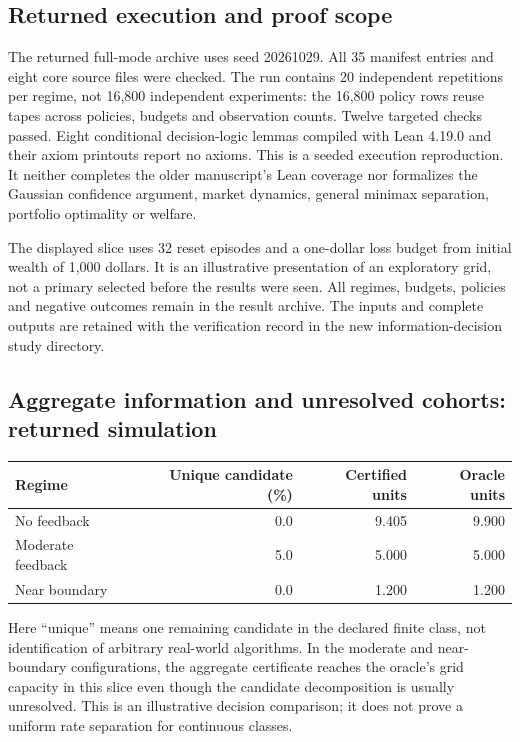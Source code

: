 \documentclass[12pt]{article}
\theoremstyle{definition}
\theoremstyle{remark}
\begin{document}
\subsection*{Returned execution and proof scope}
The returned full-mode archive uses seed 20261029. All 35 manifest entries and
eight core source files were checked. The run contains 20 independent
repetitions per regime, not 16,800 independent experiments: the 16,800 policy
rows reuse tapes across policies, budgets and observation counts. Twelve
targeted checks passed. Eight conditional decision-logic lemmas compiled with
Lean 4.19.0 and their axiom printouts report no axioms. This is a seeded
execution reproduction. It neither completes the older manuscript's Lean
coverage nor formalizes the Gaussian confidence argument, market dynamics,
general minimax separation, portfolio optimality or welfare.

The displayed slice uses 32 reset episodes and a one-dollar loss budget from
initial wealth of 1,000 dollars. It is an illustrative presentation of an
exploratory grid, not a primary selected before the results were seen. All
regimes, budgets, policies and negative outcomes remain in the result archive.
The inputs and complete outputs are retained with the verification record in
the new information-decision study directory.

\subsection*{Aggregate information and unresolved cohorts: returned simulation}
\begin{center}\small
\begin{tabular}{lrrr}
\toprule
Regime & Unique candidate (\%) & Certified units & Oracle units\\
\midrule
No feedback & 0.0 & 9.405 & 9.900\\
Moderate feedback & 5.0 & 5.000 & 5.000\\
Near boundary & 0.0 & 1.200 & 1.200\\
\bottomrule
\end{tabular}
\end{center}
Here ``unique'' means one remaining candidate in the declared finite class,
not identification of arbitrary real-world algorithms. In the moderate and
near-boundary configurations, the aggregate certificate reaches the oracle's
grid capacity in this slice even though the candidate decomposition is usually
unresolved. This is an illustrative decision comparison; it does not prove a
uniform rate separation for continuous classes.
\end{document}

